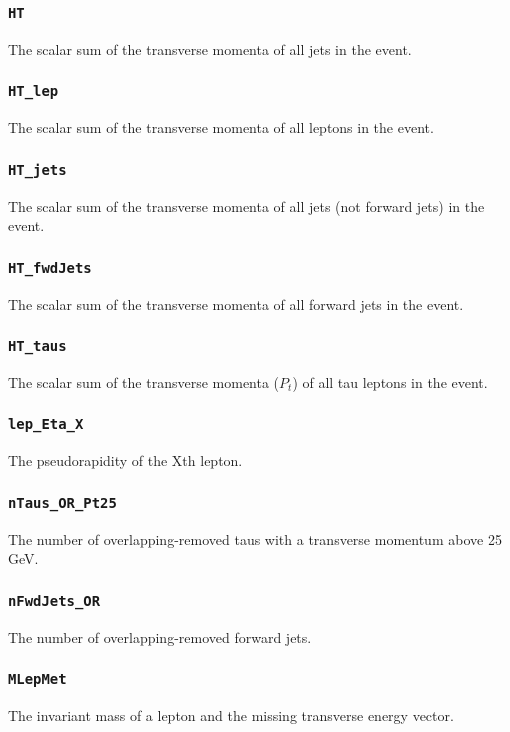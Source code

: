 \subsubsection{\texttt{HT}} The scalar sum of the transverse momenta of all jets in the event.

\subsubsection{\texttt{HT\_lep}} The scalar sum of the transverse momenta of all leptons in the event.

\subsubsection{\texttt{HT\_jets}} The scalar sum of the transverse momenta of all jets (not forward jets) in the event.

\subsubsection{\texttt{HT\_fwdJets}} The scalar sum of the transverse momenta of all forward jets in the event.

\subsubsection{\texttt{HT\_taus}} The scalar sum of the transverse momenta ($P_t$) of all tau leptons in the event.

\subsubsection{\texttt{lep\_Eta\_X}} The pseudorapidity of the Xth lepton.

\subsubsection{\texttt{nTaus\_OR\_Pt25}} The number of overlapping-removed taus with a transverse momentum above 25 GeV.

\subsubsection{\texttt{nFwdJets\_OR}} The number of overlapping-removed forward jets.

\subsubsection{\texttt{MLepMet}} The invariant mass of a lepton and the missing transverse energy vector.

